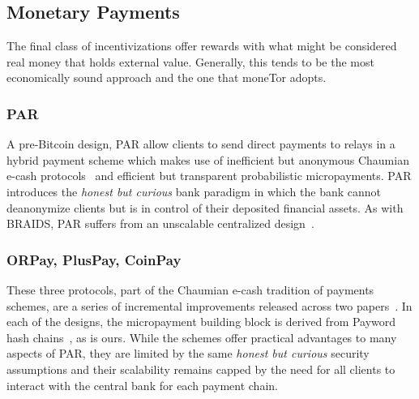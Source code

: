 \subsection{Monetary Payments}
\label{sub:monetary}

The final class of incentivizations offer rewards with what might be considered
real money that holds external value. Generally, this tends to be the most
economically sound approach and the one that moneTor adopts.

\subsubsection{PAR} A pre-Bitcoin design, PAR allow clients to send direct
payments to relays in a hybrid payment scheme which makes use of inefficient but
anonymous Chaumian e-cash protocols~\cite{chaum1988untraceable} and efficient
but transparent probabilistic micropayments. PAR introduces the \emph{honest but
  curious} bank paradigm in which the bank cannot deanonymize clients but is in
control of their deposited financial assets. As with BRAIDS, PAR suffers from an
unscalable centralized design~\cite{androulaki2008payment}.

\subsubsection{ORPay, PlusPay, CoinPay} These three protocols, part of the
Chaumian e-cash tradition of payments schemes, are a series of incremental
improvements released across two papers~\cite{chen2009xpay,
  carbunar2012tipping}. In each of the designs, the micropayment building block
is derived from Payword hash chains~\cite{rivest1996payword}, as is ours. While
the schemes offer practical advantages to many aspects of PAR, they are limited
by the same \emph{honest but curious} security assumptions and their scalability
remains capped by the need for all clients to interact with the central bank for
each payment chain.

